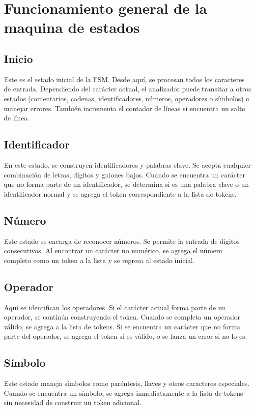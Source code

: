 \documentclass[conference]{IEEEtran}
\begin{document}
	\section{Funcionamiento general de la maquina de estados}
	
	\subsection{Inicio}
	Este es el estado inicial de la FSM. Desde aquí, se procesan todos los caracteres de entrada. Dependiendo del carácter actual, el analizador puede transitar a otros estados (comentarios, cadenas, identificadores, números, operadores o símbolos) o manejar errores. También incrementa el contador de líneas si encuentra un salto de línea.
	
	\subsection{Identificador}
	En este estado, se construyen identificadores y palabras clave. Se acepta cualquier combinación de letras, dígitos y guiones bajos. Cuando se encuentra un carácter que no forma parte de un identificador, se determina si es una palabra clave o un identificador normal y se agrega el token correspondiente a la lista de tokens.
	
	\subsection{Número}
	Este estado se encarga de reconocer números. Se permite la entrada de dígitos consecutivos. Al encontrar un carácter no numérico, se agrega el número completo como un token a la lista y se regresa al estado inicial.
	
	\subsection{Operador}
	Aquí se identifican los operadores. Si el carácter actual forma parte de un operador, se continúa construyendo el token. Cuando se completa un operador válido, se agrega a la lista de tokens. Si se encuentra un carácter que no forma parte del operador, se agrega el token si es válido, o se lanza un error si no lo es.
	
	\subsection{Símbolo}
	Este estado maneja símbolos como paréntesis, llaves y otros caracteres especiales. Cuando se encuentra un símbolo, se agrega inmediatamente a la lista de tokens sin necesidad de construir un token adicional.
	
\end{document}
